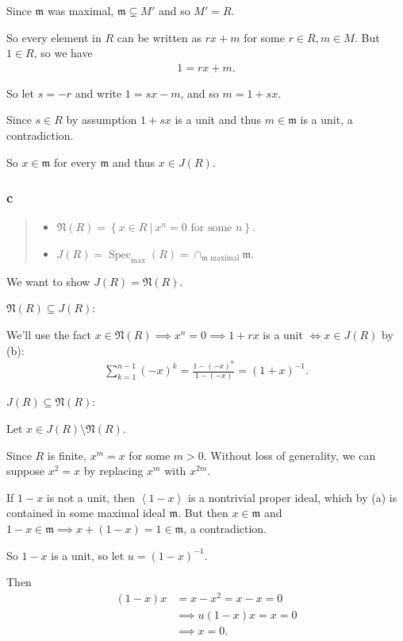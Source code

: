 \begin{solution}
Since \(\mathfrak{m}\) was maximal, \(\mathfrak{m} \subsetneq M'\) and
so \(M' = R\).

So every element in \(R\) can be written as \(rx + m\) for some
\(r\in R, m\in M\). But \(1\in R\), so we have
\begin{align*}
1 = rx + m
.\end{align*}

So let \(s = -r\) and write \(1 = sx - m\), and so \(m = 1 + sx\).

Since \(s\in R\) by assumption \(1+sx\) is a unit and thus
\(m \in \mathfrak{m}\) is a unit, a contradiction.

So \(x\in \mathfrak{m}\) for every \(\mathfrak{m}\) and thus
\(x\in J(R)\).

\hypertarget{c-19}{%
\subsubsection{c}\label{c-19}}

\begin{quote}
\begin{itemize}
\tightlist
\item
  \(\mathfrak N(R) = \left\{{x\in R {~\mathrel{\Big|}~}x^n = 0 \text{ for some } n}\right\}\).
\item
  \(J(R) = \operatorname{Spec}_{\text{max}}(R) = \displaystyle\cap_{{\mathfrak{m}}\text{ maximal}} {\mathfrak{m}}\).
\end{itemize}
\end{quote}

We want to show \(J(R) = \mathfrak N(R)\).

\(\mathfrak N(R) \subseteq J(R)\):

We'll use the fact
\(x\in \mathfrak N(R) \implies x^n = 0 \implies 1 + rx\) is a unit
\(\iff x\in J(R)\) by (b):
\begin{align*}
\sum_{k=1}^{n-1} (-x)^k = \frac{1 - (-x)^n}{1- (-x)} = (1+x)^{-1}
.\end{align*}

\(J(R) \subseteq \mathfrak N(R)\):

Let \(x \in J(R) \setminus \mathfrak N(R)\).

Since \(R\) is finite, \(x^m = x\) for some \(m > 0\). Without loss of
generality, we can suppose \(x^2 = x\) by replacing \(x^m\) with
\(x^{2m}\).

If \(1-x\) is not a unit, then \(\left\langle{1-x}\right\rangle\) is a
nontrivial proper ideal, which by (a) is contained in some maximal ideal
\({\mathfrak{m}}\). But then \(x\in {\mathfrak{m}}\) and
\(1-x \in {\mathfrak{m}}\implies x + (1-x) = 1 \in {\mathfrak{m}}\), a
contradiction.

So \(1-x\) is a unit, so let \(u = (1-x)^{-1}\).

Then
\begin{align*}
(1-x)x &= x - x^2 = x - x = 0 \\
&\implies u (1-x)x = x = 0 \\
&\implies x=0
.\end{align*}

\end{solution}

